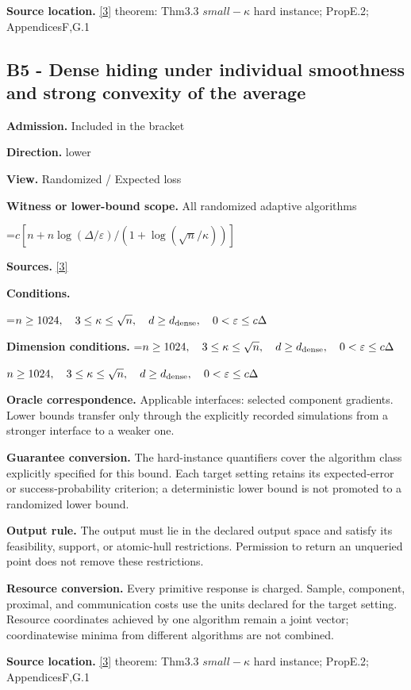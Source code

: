 \documentclass[10pt,a4paper]{article}
\newcommand{\AtlasMath}[1]{\par\begingroup\centering\setbox0=\hbox{$\displaystyle #1$}\ifdim\wd0>1.4\linewidth\typeout{ATLAS WIDE FORMULA: \the\wd0}\fi\ifdim\wd0>\linewidth\resizebox{\linewidth}{!}{\box0}\else\box0\fi\par\endgroup}
\newcommand{\AtlasInlineMath}[1]{\begingroup\setbox0=\hbox{$#1$}\ifdim\wd0>.4\linewidth\endgroup\AtlasMath{#1}\else\endgroup$#1$\fi}
\begin{document}
\textbf{Source location.} \href{https://arxiv.org/pdf/2609.00045v3}{[3]} theorem: Thm3.3 $small-\kappa$ hard instance; PropE.2; AppendicesF,G.1

\subsection{B5 - Dense hiding under individual smoothness and strong convexity of the average}
\textbf{Admission.} Included in the bracket

\textbf{Direction.} lower

\textbf{View.} Randomized / Expected loss

\textbf{Witness or lower-bound scope.} All randomized adaptive algorithms

\AtlasMath{c[n+n\log(\Delta/\varepsilon)/(1+\log(\sqrt n/\kappa))]}
\textbf{Sources.} \href{https://arxiv.org/pdf/2609.00045v3}{[3]}

\textbf{Conditions.} 
\AtlasMath{n\ge1024,\quad3\le\kappa\le\sqrt n,\quad d\ge d_{\rm dense},\quad0<\varepsilon\le c\Delta}


\textbf{Dimension conditions.} \AtlasInlineMath{n\ge1024,\quad3\le\kappa\le\sqrt n,\quad d\ge d_{\rm dense},\quad0<\varepsilon\le c\Delta}

\textbf{Oracle correspondence.} Applicable interfaces: selected component gradients. Lower bounds transfer only through the explicitly recorded simulations from a stronger interface to a weaker one.

\textbf{Guarantee conversion.} The hard-instance quantifiers cover the algorithm class explicitly specified for this bound. Each target setting retains its expected-error or success-probability criterion; a deterministic lower bound is not promoted to a randomized lower bound.

\textbf{Output rule.} The output must lie in the declared output space and satisfy its feasibility, support, or atomic-hull restrictions. Permission to return an unqueried point does not remove these restrictions.

\textbf{Resource conversion.} Every primitive response is charged. Sample, component, proximal, and communication costs use the units declared for the target setting. Resource coordinates achieved by one algorithm remain a joint vector; coordinatewise minima from different algorithms are not combined.

\textbf{Source location.} \href{https://arxiv.org/pdf/2609.00045v3}{[3]} theorem: Thm3.3 $small-\kappa$ hard instance; PropE.2; AppendicesF,G.1
\end{document}
